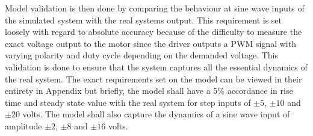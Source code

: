 Model validation is then done by comparing the behaviour at sine wave inputs of
the simulated system with the real systems output.  This requirement is set
loosely with regard to absolute accuracy because of the difficulty to measure
the exact voltage output to the motor since the driver outputs a PWM signal with
varying polarity and duty cycle depending on the demanded voltage. This
validation is done to ensure that the system captures all the essential dynamics
of the real system. The exact requirements set on the model can be viewed in
their entirety in Appendix %
but briefly, the model shall have a 5\% accordance in rise time and steady state
value with the real system for step inputs of $\pm5$, $\pm10$ and $\pm20$ volts.
The model shall also capture the dynamics of a sine wave input of amplitude
$\pm2$, $\pm8$ and $\pm16$ volts. 

